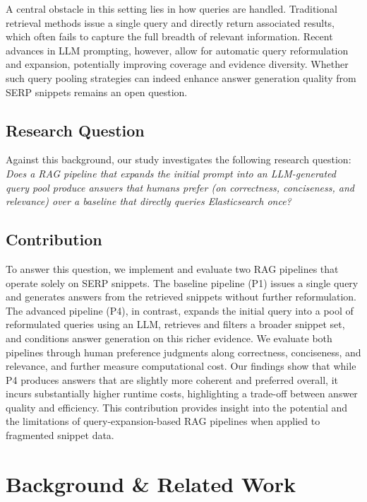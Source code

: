 \documentclass[manuscript,screen]{acmart}
\begin{document}
\begin{CCSXML}
A central obstacle in this setting lies in how queries are handled. Traditional retrieval methods issue a single query and directly return associated results, which often fails to capture the full breadth of relevant information. Recent advances in LLM prompting, however, allow for automatic query reformulation and expansion, potentially improving coverage and evidence diversity. Whether such query pooling strategies can indeed enhance answer generation quality from SERP snippets remains an open question.

\subsection{Research Question}
Against this background, our study investigates the following research question: 
\emph{Does a RAG pipeline that expands the initial prompt into an LLM-generated query pool produce answers that humans prefer (on correctness, conciseness, and relevance) over a baseline that directly queries Elasticsearch once?}

\subsection{Contribution}
To answer this question, we implement and evaluate two RAG pipelines that operate solely on SERP snippets. The baseline pipeline (P1) issues a single query and generates answers from the retrieved snippets without further reformulation. The advanced pipeline (P4), in contrast, expands the initial query into a pool of reformulated queries using an LLM, retrieves and filters a broader snippet set, and conditions answer generation on this richer evidence. We evaluate both pipelines through human preference judgments along correctness, conciseness, and relevance, and further measure computational cost. Our findings show that while P4 produces answers that are slightly more coherent and preferred overall, it incurs substantially higher runtime costs, highlighting a trade-off between answer quality and efficiency. This contribution provides insight into the potential and the limitations of query-expansion-based RAG pipelines when applied to fragmented snippet data.

\section{Background \& Related Work}


\end{CCSXML}
\end{document}
